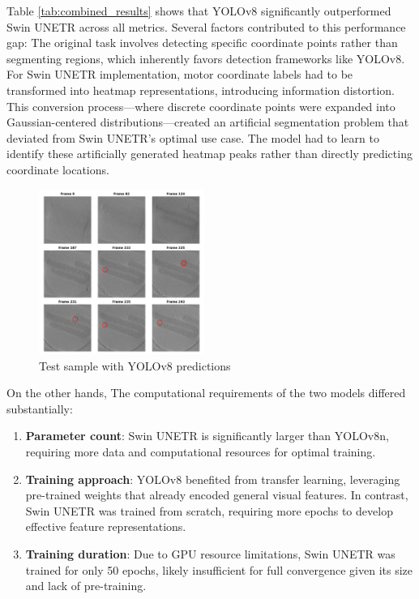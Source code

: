 \documentclass{article}
\begin{document}
Table \ref{tab:combined_results} shows that YOLOv8 significantly outperformed Swin UNETR across all metrics. Several factors contributed to this performance gap:
The original task involves detecting specific coordinate points rather than segmenting regions, which inherently favors detection frameworks like YOLOv8. For Swin UNETR implementation, motor coordinate labels had to be transformed into heatmap representations, introducing information distortion. This conversion process—where discrete coordinate points were expanded into Gaussian-centered distributions—created an artificial segmentation problem that deviated from Swin UNETR's optimal use case. The model had to learn to identify these artificially generated heatmap peaks rather than directly predicting coordinate locations.

\begin{figure}[htb]
    \centering
    \includegraphics[width=0.48\textwidth]{images/test_sample.png}
    \caption{Test sample with YOLOv8 predictions}
    \label{fig:test_sample}
\end{figure}

On the other hands, The computational requirements of the two models differed substantially:

\begin{enumerate}
    \item \textbf{Parameter count}: Swin UNETR is significantly larger than YOLOv8n, requiring more data and computational resources for optimal training.
    \item \textbf{Training approach}: YOLOv8 benefited from transfer learning, leveraging pre-trained weights that already encoded general visual features. In contrast, Swin UNETR was trained from scratch, requiring more epochs to develop effective feature representations.
    \item \textbf{Training duration}: Due to GPU resource limitations, Swin UNETR was trained for only 50 epochs, likely insufficient for full convergence given its size and lack of pre-training.
\end{enumerate}
\end{document}
